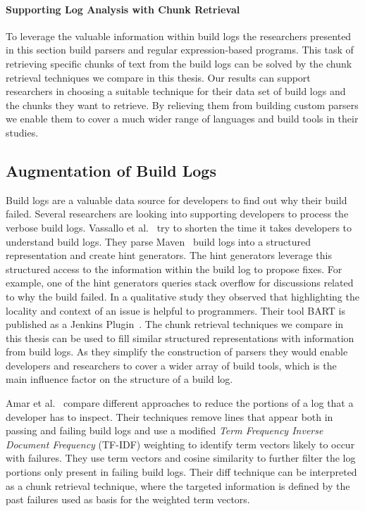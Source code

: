 \documentclass[\myrootdir/main.tex]{subfiles}
\begin{document}
\paragraph{Supporting Log Analysis with Chunk Retrieval}
To leverage the valuable information within build logs the researchers presented in this section build parsers and regular expression-based programs.
This task of retrieving specific chunks of text from the build logs can be solved by the chunk retrieval techniques we compare in this thesis.
Our results can support researchers in choosing a suitable technique for their data set of build logs and the chunks they want to retrieve.
By relieving them from building custom parsers we enable them to cover a much wider range of languages and build tools in their studies.

\subsection{Augmentation of Build Logs}
\label{sec:rw-bl-analysis}
Build logs are a valuable data source for developers to find out why their build failed.
Several researchers are looking into supporting developers to process the verbose build logs.
Vassallo et al.~\cite{vassallo2018un-break} try to shorten the time it takes developers to understand build logs.
They parse Maven~\cite{maven2019website} build logs into a structured representation and create hint generators.
The hint generators leverage this structured access to the information within the build log to propose fixes.
For example, one of the hint generators queries stack overflow for discussions related to why the build failed.
In a qualitative study they observed that highlighting the locality and context of an issue is helpful to programmers.
Their tool BART is published as a Jenkins Plugin~\cite{bart2019plugin}.
The chunk retrieval techniques we compare in this thesis can be used to fill similar structured representations with information from build logs.
As they simplify the construction of parsers they would enable developers and researchers to cover a wider array of build tools, which is the main influence factor on the structure of a build log.

Amar et al.~\cite{amar2019mining} compare different approaches to reduce the portions of a log that a developer has to inspect.
Their techniques remove lines that appear both in passing and failing build logs and use a modified \emph{Term Frequency Inverse Document Frequency} (TF-IDF) weighting to identify term vectors likely to occur with failures.
They use term vectors and cosine similarity to further filter the log portions only present in failing build logs.
Their diff technique can be interpreted as a chunk retrieval technique, where the targeted information is defined by the past failures used as basis for the weighted term vectors.
\end{document}

